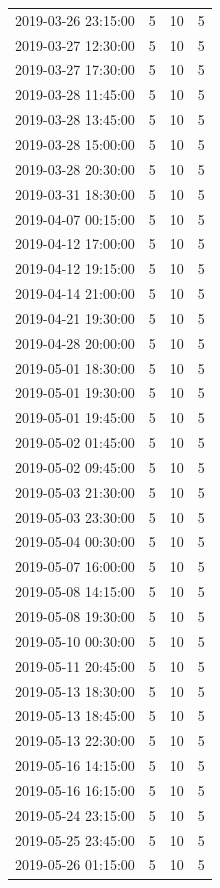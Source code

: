 \begin{tabular}{lrrr}
2019-03-26 23:15:00 & 5 & 10 & 5 \\
2019-03-27 12:30:00 & 5 & 10 & 5 \\
2019-03-27 17:30:00 & 5 & 10 & 5 \\
2019-03-28 11:45:00 & 5 & 10 & 5 \\
2019-03-28 13:45:00 & 5 & 10 & 5 \\
2019-03-28 15:00:00 & 5 & 10 & 5 \\
2019-03-28 20:30:00 & 5 & 10 & 5 \\
2019-03-31 18:30:00 & 5 & 10 & 5 \\
2019-04-07 00:15:00 & 5 & 10 & 5 \\
2019-04-12 17:00:00 & 5 & 10 & 5 \\
2019-04-12 19:15:00 & 5 & 10 & 5 \\
2019-04-14 21:00:00 & 5 & 10 & 5 \\
2019-04-21 19:30:00 & 5 & 10 & 5 \\
2019-04-28 20:00:00 & 5 & 10 & 5 \\
2019-05-01 18:30:00 & 5 & 10 & 5 \\
2019-05-01 19:30:00 & 5 & 10 & 5 \\
2019-05-01 19:45:00 & 5 & 10 & 5 \\
2019-05-02 01:45:00 & 5 & 10 & 5 \\
2019-05-02 09:45:00 & 5 & 10 & 5 \\
2019-05-03 21:30:00 & 5 & 10 & 5 \\
2019-05-03 23:30:00 & 5 & 10 & 5 \\
2019-05-04 00:30:00 & 5 & 10 & 5 \\
2019-05-07 16:00:00 & 5 & 10 & 5 \\
2019-05-08 14:15:00 & 5 & 10 & 5 \\
2019-05-08 19:30:00 & 5 & 10 & 5 \\
2019-05-10 00:30:00 & 5 & 10 & 5 \\
2019-05-11 20:45:00 & 5 & 10 & 5 \\
2019-05-13 18:30:00 & 5 & 10 & 5 \\
2019-05-13 18:45:00 & 5 & 10 & 5 \\
2019-05-13 22:30:00 & 5 & 10 & 5 \\
2019-05-16 14:15:00 & 5 & 10 & 5 \\
2019-05-16 16:15:00 & 5 & 10 & 5 \\
2019-05-24 23:15:00 & 5 & 10 & 5 \\
2019-05-25 23:45:00 & 5 & 10 & 5 \\
2019-05-26 01:15:00 & 5 & 10 & 5 \\

\end{tabular}
